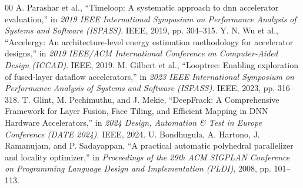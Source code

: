 \documentclass[conference]{IEEEtran}
\begin{document}
\begin{thebibliography}{00}
 A. Parashar et al., ``Timeloop: A systematic approach to dnn accelerator evaluation,'' in \textit{2019 IEEE International Symposium on Performance Analysis of Systems and Software (ISPASS)}. IEEE, 2019, pp. 304--315.
 Y. N. Wu et al., ``Accelergy: An architecture-level energy estimation methodology for accelerator designs,'' in \textit{2019 IEEE/ACM International Conference on Computer-Aided Design (ICCAD)}. IEEE, 2019.
 M. Gilbert et al., ``Looptree: Enabling exploration of fused-layer dataflow accelerators,'' in \textit{2023 IEEE International Symposium on Performance Analysis of Systems and Software (ISPASS)}. IEEE, 2023, pp. 316--318.
 T. Glint, M. Pechimuthu, and J. Mekie, ``DeepFrack: A Comprehensive Framework for Layer Fusion, Face Tiling, and Efficient Mapping in DNN Hardware Accelerators,'' in \textit{2024 Design, Automation \& Test in Europe Conference (DATE 2024)}. IEEE, 2024.
 U. Bondhugula, A. Hartono, J. Ramanujam, and P. Sadayappan, ``A practical automatic polyhedral parallelizer and locality optimizer,'' in \textit{Proceedings of the 29th ACM SIGPLAN Conference on Programming Language Design and Implementation (PLDI)}, 2008, pp. 101--113.
\end{thebibliography}
\end{document}
